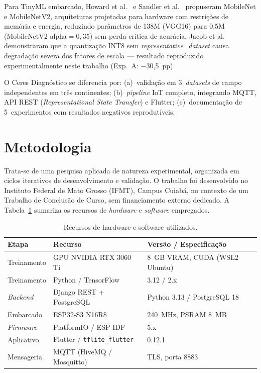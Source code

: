 \documentclass[12pt]{article}
\begin{document}
Para TinyML embarcado, Howard et al.~\cite{howard2017} e Sandler
et al.~\cite{sandler2018} propuseram MobileNet e MobileNetV2, arquiteturas projetadas
para hardware com restrições de memória e energia, reduzindo parâmetros de 138M
(VGG16) para 0,5M (MobileNetV2 alpha$=0{,}35$) sem perda crítica de acurácia.
Jacob et al.~\cite{jacob2018} demonstraram que a quantização INT8 sem
\textit{representative\_dataset} causa degradação severa dos fatores de escala ---
resultado reproduzido experimentalmente neste trabalho (Exp.~A: $-$30,5~pp).

O Ceres Diagnóstico se diferencia por: (a)~validação em 3~\textit{datasets} de campo
independentes em três continentes; (b)~\textit{pipeline} IoT completo, integrando
MQTT, API REST (\textit{Representational State Transfer}) e Flutter;
(c)~documentação de 5~experimentos com resultados negativos reprodutíveis.


\section{Metodologia}

Trata-se de uma pesquisa aplicada de natureza experimental, organizada em ciclos
iterativos de desenvolvimento e validação. O trabalho foi desenvolvido no Instituto
Federal de Mato Grosso (IFMT), Campus Cuiabá, no contexto de um Trabalho de
Conclusão de Curso, sem financiamento externo dedicado. A Tabela~\ref{tab:recursos}
sumariza os recursos de \textit{hardware} e \textit{software} empregados.

\begin{table}[ht]
\centering
\caption{Recursos de hardware e software utilizados.}
\label{tab:recursos}
\begin{tabular}{@{}lll@{}}
\toprule
\textbf{Etapa} & \textbf{Recurso} & \textbf{Versão / Especificação} \\
\midrule
Treinamento  & GPU NVIDIA RTX 3060 Ti           & 8~GB VRAM, CUDA (WSL2 Ubuntu) \\
Treinamento  & Python / TensorFlow              & 3.12 / 2.x \\
\textit{Backend} & Django REST + PostgreSQL      & Python 3.13 / PostgreSQL 18 \\
Embarcado    & ESP32-S3 N16R8                   & 240~MHz, PSRAM 8~MB \\
\textit{Firmware} & PlatformIO / ESP-IDF         & 5.x \\
Aplicativo   & Flutter / \texttt{tflite\_flutter} & 0.12.1 \\
Mensageria   & MQTT (HiveMQ / Mosquitto)        & TLS, porta 8883 \\
\bottomrule
\end{tabular}
\end{table}
\end{document}
